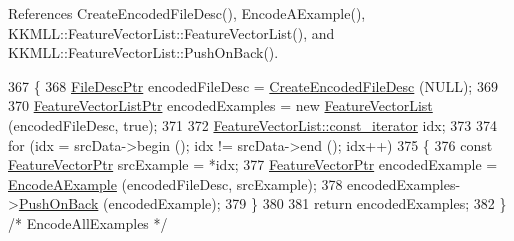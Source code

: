 References Create\+Encoded\+File\+Desc(), Encode\+A\+Example(), K\+K\+M\+L\+L\+::\+Feature\+Vector\+List\+::\+Feature\+Vector\+List(), and K\+K\+M\+L\+L\+::\+Feature\+Vector\+List\+::\+Push\+On\+Back().


\begin{DoxyCode}
367 \{
368   \hyperlink{class_k_k_m_l_l_1_1_file_desc}{FileDescPtr}  encodedFileDesc = \hyperlink{class_k_k_m_l_l_1_1_feature_encoder_a9a6f0f195cb6856e88caf0aec52dd54a}{CreateEncodedFileDesc} (NULL);
369 
370   \hyperlink{class_k_k_m_l_l_1_1_feature_vector_list}{FeatureVectorListPtr}  encodedExamples = \textcolor{keyword}{new} 
      \hyperlink{class_k_k_m_l_l_1_1_feature_vector_list}{FeatureVectorList} (encodedFileDesc, \textcolor{keyword}{true});
371 
372   \hyperlink{class_k_k_b_1_1_k_k_queue_aeb057c9c010446f46f57c1e355f981f1}{FeatureVectorList::const\_iterator}  idx;
373 
374   \textcolor{keywordflow}{for}  (idx = srcData->begin ();  idx !=  srcData->end ();   idx++)
375   \{
376     \textcolor{keyword}{const} \hyperlink{class_k_k_m_l_l_1_1_feature_vector}{FeatureVectorPtr} srcExample = *idx;
377     \hyperlink{class_k_k_m_l_l_1_1_feature_vector}{FeatureVectorPtr}  encodedExample = \hyperlink{class_k_k_m_l_l_1_1_feature_encoder_af82278dec57d34f3ebcf6ea97cc625d2}{EncodeAExample} (encodedFileDesc, 
      srcExample);
378     encodedExamples->\hyperlink{class_k_k_m_l_l_1_1_feature_vector_list_abd43779a90a6aa3db1de8092be877bdb}{PushOnBack} (encodedExample);
379   \}
380 
381   \textcolor{keywordflow}{return}  encodedExamples;
382 \}  \textcolor{comment}{/* EncodeAllExamples */}
\end{DoxyCode}
